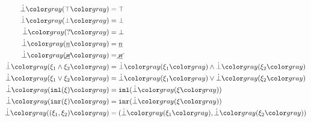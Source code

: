 ~~
\begin{subequations}\label{defn:falsify}
\begin{align}
  \cfalsify{\ctruth} &= \ctruth \\
  \cfalsify{\cfalsity} &= \cfalsity \\
  \cfalsify{\cunknown} &= \cfalsity \\
  \cfalsify{\cnum{n}} &= \cnum{n} \\
  \cfalsify{\cnotnum{n}} &= \cnotnum{n} \\
  \cfalsify{\cand{\xi_1}{\xi_2}} &= \cand{\cfalsify{\xi_1}}{\cfalsify{\xi_2}} \\
  \cfalsify{\cor{\xi_1}{\xi_2}} &= \cor{\cfalsify{\xi_1}}{\cfalsify{\xi_2}} \\
  \cfalsify{\cinl{\xi}} &= \cinl{\cfalsify{\xi}} \\
  \cfalsify{\cinr{\xi}} &= \cinr{\cfalsify{\xi}} \\
  \cfalsify{\cpair{\xi_1}{\xi_2}} &= \cpair{\cfalsify{\xi_1}}{\cfalsify{\xi_2}}
\end{align}
\end{subequations}

